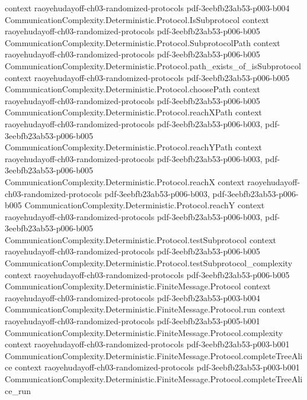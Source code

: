 \begin{theorem}
  {context}
  {raoyehudayoff-ch03-randomized-protocols}
  {pdf-3eebfb23ab53-p003-b004}
\proofstep
  {CommunicationComplexity.Deterministic.Protocol.IsSubprotocol}
  {context}
  {raoyehudayoff-ch03-randomized-protocols}
  {pdf-3eebfb23ab53-p006-b005}
\proofstep
  {CommunicationComplexity.Deterministic.Protocol.SubprotocolPath}
  {context}
  {raoyehudayoff-ch03-randomized-protocols}
  {pdf-3eebfb23ab53-p006-b005}
\proofstep
  {CommunicationComplexity.Deterministic.Protocol.path_exists_of_isSubprotocol}
  {context}
  {raoyehudayoff-ch03-randomized-protocols}
  {pdf-3eebfb23ab53-p006-b005}
\proofstep
  {CommunicationComplexity.Deterministic.Protocol.choosePath}
  {context}
  {raoyehudayoff-ch03-randomized-protocols}
  {pdf-3eebfb23ab53-p006-b005}
\proofstep
  {CommunicationComplexity.Deterministic.Protocol.reachXPath}
  {context}
  {raoyehudayoff-ch03-randomized-protocols}
  {pdf-3eebfb23ab53-p006-b003,
    pdf-3eebfb23ab53-p006-b005}
\proofstep
  {CommunicationComplexity.Deterministic.Protocol.reachYPath}
  {context}
  {raoyehudayoff-ch03-randomized-protocols}
  {pdf-3eebfb23ab53-p006-b003,
    pdf-3eebfb23ab53-p006-b005}
\proofstep
  {CommunicationComplexity.Deterministic.Protocol.reachX}
  {context}
  {raoyehudayoff-ch03-randomized-protocols}
  {pdf-3eebfb23ab53-p006-b003,
    pdf-3eebfb23ab53-p006-b005}
\proofstep
  {CommunicationComplexity.Deterministic.Protocol.reachY}
  {context}
  {raoyehudayoff-ch03-randomized-protocols}
  {pdf-3eebfb23ab53-p006-b003,
    pdf-3eebfb23ab53-p006-b005}
\proofstep
  {CommunicationComplexity.Deterministic.Protocol.testSubprotocol}
  {context}
  {raoyehudayoff-ch03-randomized-protocols}
  {pdf-3eebfb23ab53-p006-b005}
\proofstep
  {CommunicationComplexity.Deterministic.Protocol.testSubprotocol_complexity}
  {context}
  {raoyehudayoff-ch03-randomized-protocols}
  {pdf-3eebfb23ab53-p006-b005}
\proofstep
  {CommunicationComplexity.Deterministic.FiniteMessage.Protocol}
  {context}
  {raoyehudayoff-ch03-randomized-protocols}
  {pdf-3eebfb23ab53-p003-b004}
\proofstep
  {CommunicationComplexity.Deterministic.FiniteMessage.Protocol.run}
  {context}
  {raoyehudayoff-ch03-randomized-protocols}
  {pdf-3eebfb23ab53-p005-b001}
\proofstep
  {CommunicationComplexity.Deterministic.FiniteMessage.Protocol.complexity}
  {context}
  {raoyehudayoff-ch03-randomized-protocols}
  {pdf-3eebfb23ab53-p003-b001}
\proofstep
  {CommunicationComplexity.Deterministic.FiniteMessage.Protocol.completeTreeAlice}
  {context}
  {raoyehudayoff-ch03-randomized-protocols}
  {pdf-3eebfb23ab53-p003-b001}
\proofstep
  {CommunicationComplexity.Deterministic.FiniteMessage.Protocol.completeTreeAlice_run}

\end{theorem}
